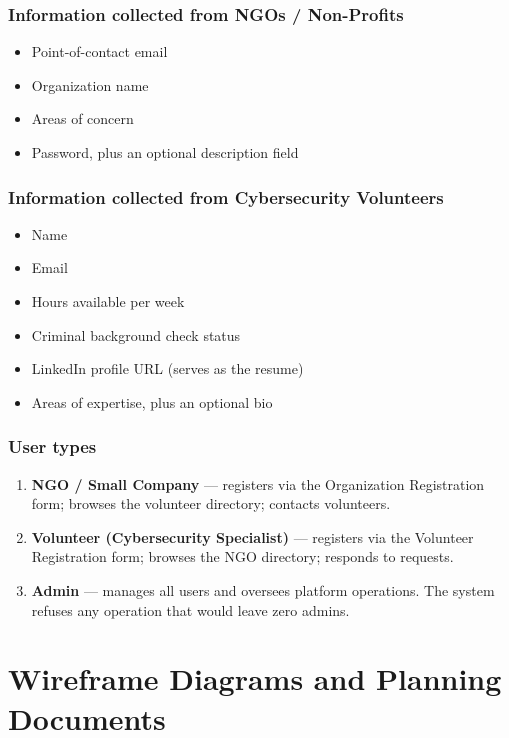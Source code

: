 \documentclass[11pt,letterpaper]{article}
\begin{document}
\subsubsection*{Information collected from NGOs / Non-Profits}
\begin{itemize}
  \item Point-of-contact email
  \item Organization name
  \item Areas of concern
  \item Password, plus an optional description field
\end{itemize}

\subsubsection*{Information collected from Cybersecurity Volunteers}
\begin{itemize}
  \item Name
  \item Email
  \item Hours available per week
  \item Criminal background check status
  \item LinkedIn profile URL (serves as the resume)
  \item Areas of expertise, plus an optional bio
\end{itemize}

\subsubsection*{User types}
\begin{enumerate}
  \item \textbf{NGO / Small Company} --- registers via the Organization
        Registration form; browses the volunteer directory; contacts volunteers.
  \item \textbf{Volunteer (Cybersecurity Specialist)} --- registers via the
        Volunteer Registration form; browses the NGO directory; responds to requests.
  \item \textbf{Admin} --- manages all users and oversees platform operations.
        The system refuses any operation that would leave zero admins.
\end{enumerate}

\section{Wireframe Diagrams and Planning Documents}
\end{document}
